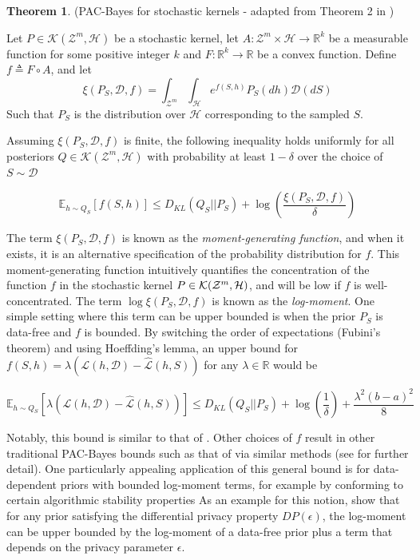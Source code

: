 \documentclass{article}
\theoremstyle{definition}
\newtheorem{theorem}{Theorem}[section]
\newcommand{\Expect}[2]{\mathbb{E}_{#1}\left [#2 \right ]}
\begin{document}
\begin{theorem} (PAC-Bayes for stochastic kernels - adapted from Theorem 2 in \citet{Rivasplata2020}) \label{thm:rivasplata-pb}
	
	Let $P\in \mathcal{K}(\mathcal{Z}^m, \mathcal{H})$ be a stochastic kernel, let $A: \mathcal{Z}^m\times \mathcal{H}\rightarrow \mathbb{R}^k$ be a measurable function for some positive integer $k$ and $F:\mathbb{R}^k\rightarrow \mathbb{R}$ be a convex function.
	Define $f\triangleq F\circ A$, and let 
	$$\xi(P_S, \mathcal{D}, f)=\int_{\mathcal{Z}^m}\int_{\mathcal{H}}e^{f(S, h)}P_S(dh)\mathcal{D}(dS)$$
	Such that $P_S$ is the distribution over $\mathcal{H}$ corresponding to the sampled $S$.
	
	Assuming $\xi(P_S, \mathcal{D}, f)$ is finite, the following inequality holds uniformly for all posteriors $Q\in \mathcal{K}(\mathcal{Z}^m, \mathcal{H})$ with probability at least $1-\delta$ over the choice of $S\sim \mathcal{D}$
	
	\begin{equation} \label{eq:ribasplata-pb}
	\Expect{h\sim Q_S}{f(S, h)} \leq D_{KL}(Q_S||P_S)+\log\left (\frac{\xi(P_S, \mathcal{D}, f)}{\delta}\right )
	\end{equation}
\end{theorem}

The term $\xi(P_S, \mathcal{D}, f)$ is known as the \emph{moment-generating function}, and when it exists, it is an alternative specification of the probability distribution for $f$.
This moment-generating function intuitively quantifies the concentration of the function $f$ in the stochastic kernel $P\in{\cal K}({\cal Z}^m,{\cal H})$, and will be low if $f$ is well-concentrated.
The term $\log\xi(P_S, \mathcal{D}, f)$ is known as the \emph{log-moment}. 
One simple setting where this term can be upper bounded is when the prior $P_S$ is data-free and $f$ is bounded. By switching the order of expectations (Fubini's theorem) and using Hoeffding's lemma, an upper bound for $f(S,h)=\lambda(\mathcal{L}(h,\mathcal{D})-\hat{\mathcal{L}}(h, S))$ for any $\lambda\in \mathbb{R}$ would be

\begin{equation} \label{eq:bound-aml-datafree}
\Expect{h\sim Q_S}{\lambda(\mathcal{L}(h,\mathcal{D})-\hat{\mathcal{L}}(h, S))} \leq D_{KL}(Q_S||P_S)+\log\left (\frac{1}{\delta}\right ) + \frac{\lambda^2(b-a)^2}{8}
\end{equation}


Notably, this bound is similar to that of \citet{Catoni2004}. Other choices of $f$ result in other traditional PAC-Bayes bounds such as that of \citet{Mcallester} via similar methods (see \citet{Rivasplata2020} for further detail). 
One particularly appealing application of this general bound is for data-dependent priors with bounded log-moment terms, for example by conforming to certain algorithmic stability properties 
As an example for this notion, \citet{Rivasplata2020} show that for any prior satisfying the differential privacy property $DP(\epsilon)$, the log-moment can be upper bounded by the log-moment of a data-free prior plus a term that depends on the privacy parameter $\epsilon$. 
\end{document}
